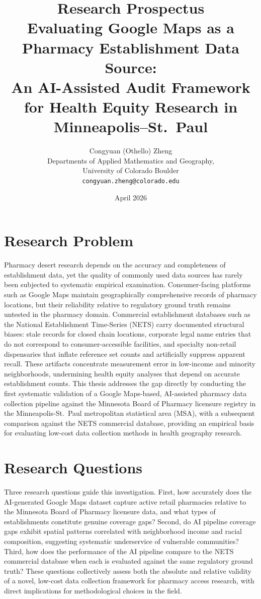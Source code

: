 \documentclass[12pt]{article}
\title{Research Prospectus\\[0.5em]
\large Evaluating Google Maps as a Pharmacy Establishment Data Source:\\
An AI-Assisted Audit Framework for Health Equity Research in\\
Minneapolis--St.\ Paul}
\author{Congyuan (Othello) Zheng\\
Departments of Applied Mathematics and Geography,\\
University of Colorado Boulder\\
\texttt{congyuan.zheng@colorado.edu}}
\date{April 2026}
\begin{document}
\maketitle
\thispagestyle{empty}

\section{Research Problem}

Pharmacy desert research depends on the accuracy and completeness of establishment data, yet the quality of commonly used data sources has rarely been subjected to systematic empirical examination. Consumer-facing platforms such as Google Maps maintain geographically comprehensive records of pharmacy locations, but their reliability relative to regulatory ground truth remains untested in the pharmacy domain. Commercial establishment databases such as the National Establishment Time-Series (NETS) carry documented structural biases: stale records for closed chain locations, corporate legal name entries that do not correspond to consumer-accessible facilities, and specialty non-retail dispensaries that inflate reference set counts and artificially suppress apparent recall. These artifacts concentrate measurement error in low-income and minority neighborhoods, undermining health equity analyses that depend on accurate establishment counts. This thesis addresses the gap directly by conducting the first systematic validation of a Google Maps-based, AI-assisted pharmacy data collection pipeline against the Minnesota Board of Pharmacy licensure registry in the Minneapolis-St.\ Paul metropolitan statistical area (MSA), with a subsequent comparison against the NETS commercial database, providing an empirical basis for evaluating low-cost data collection methods in health geography research.

\section{Research Questions}

Three research questions guide this investigation. First, how accurately does the AI-generated Google Maps dataset capture active retail pharmacies relative to the Minnesota Board of Pharmacy licensure data, and what types of establishments constitute genuine coverage gaps? Second, do AI pipeline coverage gaps exhibit spatial patterns correlated with neighborhood income and racial composition, suggesting systematic underservice of vulnerable communities? Third, how does the performance of the AI pipeline compare to the NETS commercial database when each is evaluated against the same regulatory ground truth? These questions collectively assess both the absolute and relative validity of a novel, low-cost data collection framework for pharmacy access research, with direct implications for methodological choices in the field.
\end{document}
